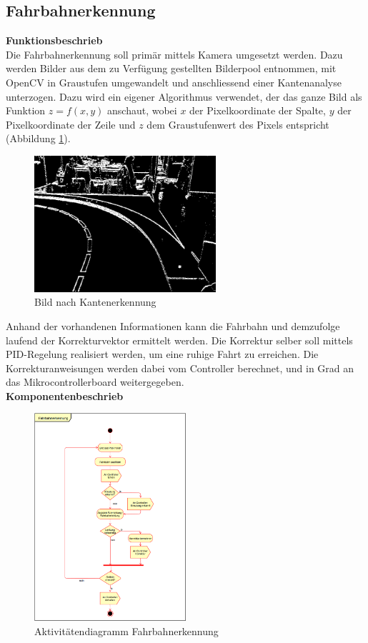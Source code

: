 \subsection{Fahrbahnerkennung}
\textbf{Funktionsbeschrieb}\\[0.2cm]
Die Fahrbahnerkennung soll primär mittels Kamera umgesetzt werden. Dazu werden Bilder aus dem zu Verfügung gestellten Bilderpool entnommen, mit OpenCV in Graustufen umgewandelt und anschliessend einer Kantenanalyse unterzogen. Dazu wird ein eigener Algorithmus verwendet, der das ganze Bild als Funktion $z = f(x,y)$ anschaut, wobei $x$ der Pixelkoordinate der Spalte, $y$ der Pixelkoordinate der Zeile und $z$ dem Graustufenwert des Pixels entspricht (Abbildung \ref{fig:edges}).
\begin{figure}[H]%
\centering
\includegraphics[width=0.6\textwidth]{03_Loesungskonzept/pictures/Kantengrafik.png}
\caption{Bild nach Kantenerkennung}
\label{fig:edges}
\end{figure}\flushleft
Anhand der vorhandenen Informationen kann die Fahrbahn und demzufolge laufend der Korrekturvektor ermittelt werden. Die Korrektur selber soll mittels PID-Regelung realisiert werden, um eine ruhige Fahrt zu erreichen. Die Korrekturanweisungen werden dabei vom Controller berechnet, und in Grad an das Mikrocontrollerboard weitergegeben.\\[0.2cm]
\textbf{Komponentenbeschrieb}
\begin{figure}[H]%
\centering
\includegraphics[width=0.5\textwidth]{03_Loesungskonzept/pictures/Fahrbahnerkennung.png}
\caption{Aktivitätendiagramm Fahrbahnerkennung}
\label{fig:activityRoute}
\end{figure}\flushleft
